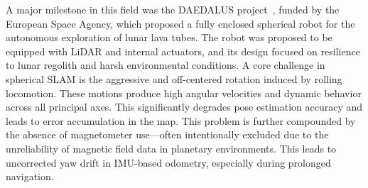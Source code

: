 \documentclass[english, bachelor, utf8]{base/thesis_telematics}
\begin{document}
A major milestone in this field was the DAEDALUS project~\cite{DAEDALUS}, funded by the European Space Agency, which proposed a fully enclosed spherical robot for the autonomous exploration of lunar lava tubes. 
The robot was proposed to be equipped with LiDAR and internal actuators, and its design focused on resilience to lunar regolith and harsh environmental conditions.
A core challenge in spherical SLAM is the aggressive and off-centered rotation induced by rolling locomotion. 
These motions produce high angular velocities and dynamic behavior across all principal axes. 
This significantly degrades pose estimation accuracy and leads to error accumulation in the map. 
This problem is further compounded by the absence of magnetometer use—often intentionally excluded due to the unreliability of magnetic field data in planetary environments.
This leads to uncorrected yaw drift in IMU-based odometry, especially during prolonged navigation.
\end{document}
